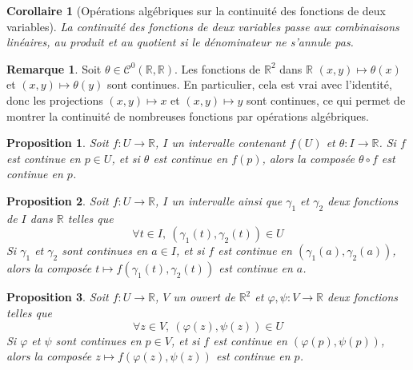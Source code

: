 \documentclass[french]{book}
\newcommand{\R}{\mathbb{R}}
\theoremstyle{plain}
\newtheorem{prop}{Proposition}[chapter]
\newtheorem{cor}{Corollaire}[chapter]
\theoremstyle{definition}
\newtheorem{rmq}{Remarque}[chapter]
\theoremstyle{remark}
\begin{document}
\begin{cor}[Opérations algébriques sur la continuité des fonctions de deux variables]
	La continuité des fonctions de deux variables passe aux combinaisons linéaires, au produit et au quotient si le dénominateur ne s'annule pas.
\end{cor}
\begin{rmq} Soit $\theta\in\mathcal{C}^0(\R,\R)$. Les fonctions de $\R^2$ dans $\R$ $(x,y)\mapsto\theta(x)$ et $(x,y)\mapsto\theta(y)$ sont continues. En particulier, cela est vrai avec l'identité, donc les projections $(x,y)\mapsto x$ et $(x,y)\mapsto y$ sont continues, ce qui permet de montrer la continuité de nombreuses fonctions par opérations algébriques. \end{rmq}
\begin{prop}
	Soit $f:U\rightarrow\R$, $I$ un intervalle contenant $f(U)$ et $\theta:I\rightarrow\R$. Si $f$ est continue en $p\in U$, et si $\theta$ est continue en $f(p)$, alors la composée $\theta\circ f$ est continue en $p$.
\end{prop}
\begin{prop}
	Soit $f:U\rightarrow\R$, $I$ un intervalle ainsi que $\gamma_1$ et $\gamma_2$ deux fonctions de $I$ dans $\R$ telles que $$\forall t \in I, \ (\gamma_1(t),\gamma_2(t))\in U$$ Si $\gamma_1$ et $\gamma_2$ sont continues en $a\in I$, et si $f$ est continue en $(\gamma_1(a),\gamma_2(a))$, alors la composée $t\mapsto f(\gamma_1(t),\gamma_2(t))$ est continue en $a$.
\end{prop}
\begin{prop}
	Soit $f:U\rightarrow\R$, $V$ un ouvert de $\R^2$ et $\varphi,\psi : V\rightarrow \R$ deux fonctions telles que $$\forall z \in V, \ (\varphi(z),\psi(z))\in U$$ Si $\varphi$ et $\psi$ sont continues en $p\in V$, et si $f$ est continue en $(\varphi(p),\psi(p))$, alors la composée $z\mapsto f(\varphi(z),\psi(z))$ est continue en $p$.
\end{prop}
\end{document}
